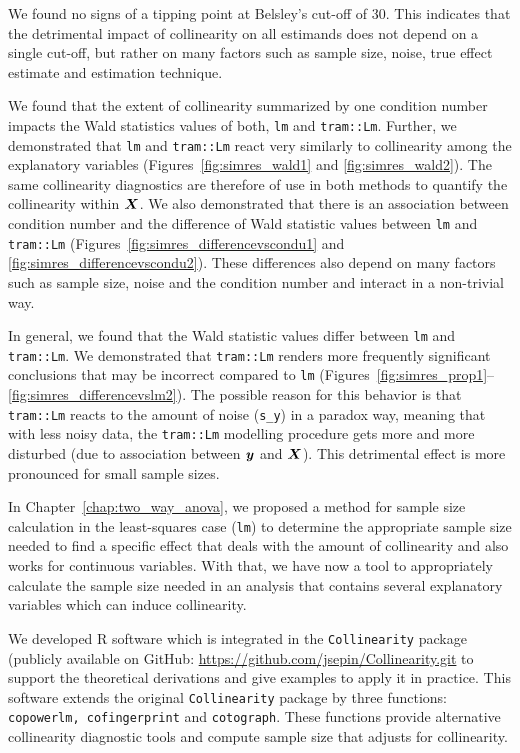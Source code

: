 \documentclass[11pt,a4paper,twoside]{book}\usepackage[]{graphicx}\usepackage[]{xcolor}
\begin{document}
We found no signs of a tipping point at Belsley's cut-off of 30. This indicates that the detrimental impact of collinearity on all estimands does not depend on a single cut-off, but rather on many factors such as sample size, noise, true effect estimate and estimation technique.
    
We found that the extent of collinearity summarized by one condition number impacts the Wald statistics values of both, \texttt{lm} and \texttt{tram::Lm}.
Further, we demonstrated that \texttt{lm} and \texttt{tram::Lm} react very similarly to collinearity among the explanatory variables (Figures~\ref{fig:simres_wald1} and \ref{fig:simres_wald2}).
The same collinearity diagnostics are therefore of use in both methods to quantify the collinearity within ${\boldsymbol{X}}$.
We also demonstrated that there is an association between condition number and the difference of Wald statistic values between \texttt{lm} and \texttt{tram::Lm} (Figures~\ref{fig:simres_differencevscondu1} and \ref{fig:simres_differencevscondu2}).
These differences also depend on many factors such as sample size, noise and the condition number and interact in a non-trivial way.

In general, we found that the Wald statistic values differ between \texttt{lm} and \texttt{tram::Lm}.
We demonstrated that \texttt{tram::Lm} renders more frequently significant conclusions that may be incorrect compared to \texttt{lm} (Figures~\ref{fig:simres_prop1}--\ref{fig:simres_differencevslm2}). The possible reason for this behavior is that \texttt{tram::Lm} reacts to the amount of noise (\texttt{s\_y}) in a paradox way, meaning that with less noisy data, the \texttt{tram::Lm} modelling procedure gets more and more disturbed (due to association between ${\textbf{\textit{y}}}$ and ${\boldsymbol{X}}$). This detrimental effect is more pronounced for small sample sizes.

In Chapter~\ref{chap:two_way_anova}, we proposed a method for sample size calculation in the least-squares case (\texttt{lm}) to determine the appropriate sample size needed to find a specific effect that deals with the amount of collinearity and also works for continuous variables.
With that, we have now a tool to appropriately calculate the sample size needed in an analysis that contains several explanatory variables which can induce collinearity. 
  
We developed \textsf{R} software which is integrated in the \texttt{Collinearity} package (publicly available on GitHub: \url{https://github.com/jsepin/Collinearity.git} to support the theoretical derivations and give examples to apply it in practice.
This software extends the original \texttt{Collinearity} package by three functions: \texttt{copowerlm, cofingerprint} and \texttt{cotograph}.
These functions provide alternative collinearity diagnostic tools and compute sample size that adjusts for collinearity.
\end{document}
